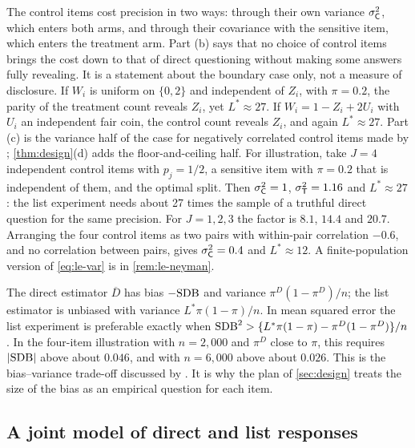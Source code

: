 The control items cost precision in two ways: through their own variance $\sigma_{\mathsf{C}}^2$, which enters both arms, and through their covariance with the sensitive item, which enters the treatment arm. Part (b) says that no choice of control items brings the cost down to that of direct questioning without making some answers fully revealing. It is a statement about the boundary case only, not a measure of disclosure. If $W_i$ is uniform on $\{0,2\}$ and independent of $Z_i$, with $\pi=0.2$, the parity of the treatment count reveals $Z_i$, yet $L^*\approx27$. If $W_i=1-Z_i+2U_i$ with $U_i$ an independent fair coin, the control count reveals $Z_i$, and again $L^*\approx27$. Part (c) is the variance half of the case for negatively correlated control items made by \citet{glynn2013}; \cref{thm:design}(d) adds the floor-and-ceiling half. For illustration, take $J=4$ independent control items with $p_j=1/2$, a sensitive item with $\pi=0.2$ that is independent of them, and the optimal split. Then $\sigma_{\mathsf{C}}^2=1$, $\sigma_{\mathsf{T}}^2=1.16$ and $L^*\approx27$: the list experiment needs about 27 times the sample of a truthful direct question for the same precision. For $J=1,2,3$ the factor is $8.1$, $14.4$ and $20.7$. Arranging the four control items as two pairs with within-pair correlation $-0.6$, and no correlation between pairs, gives $\sigma_{\mathsf{C}}^2=0.4$ and $L^*\approx12$. A finite-population version of \eqref{eq:le-var} is in \cref{rem:le-neyman}.

\begin{remark}\label{rem:le-mse}
The direct estimator $\overline D$ has bias $-\mathrm{SDB}$ and variance $\pi^D(1-\pi^D)/n$; the list estimator is unbiased with variance $L^*\pi(1-\pi)/n$. In mean squared error the list experiment is preferable exactly when $\mathrm{SDB}^2>\{L^*\pi(1-\pi)-\pi^D(1-\pi^D)\}/n$. In the four-item illustration with $n=2{,}000$ and $\pi^D$ close to $\pi$, this requires $|\mathrm{SDB}|$ above about $0.046$, and with $n=6{,}000$ above about $0.026$. This is the bias--variance trade-off discussed by \citet{blair2020}. It is why the plan of \cref{sec:design} treats the size of the bias as an empirical question for each item.
\end{remark}

\subsection{A joint model of direct and list responses}\label{sec:sens-joint}

